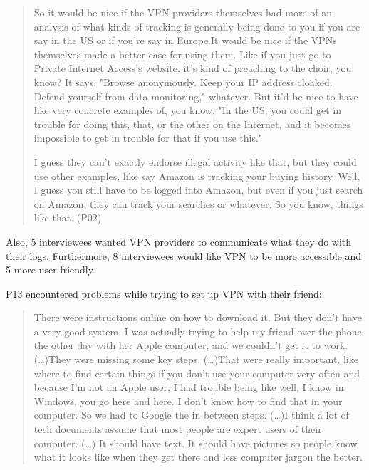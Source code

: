 \begin{quote}So it would be nice if the VPN providers themselves had more of
    an analysis of what kinds of tracking is generally being done to you if
    you are say in the US or if you're say in Europe.It would be nice if the
    VPNs themselves made a better case for using them. Like if you just go to
    Private Internet Access's website, it's kind of preaching to the choir,
    you know? It says, "Browse anonymously. Keep your IP address cloaked.
    Defend yourself from data monitoring," whatever. But it'd be nice to have
    like very concrete examples of, you know, "In the US, you could get in
    trouble for doing this, that, or the other on the Internet, and it becomes
    impossible to get in trouble for that if you use this."

I guess they can't exactly endorse illegal activity like that, but they could
use other examples, like say Amazon is tracking your buying history. Well, I
guess you still have to be logged into Amazon, but even if you just search on
Amazon, they can track your searches or whatever. So you know, things like
that. (P02)\end{quote}


Also, 5 interviewees wanted VPN providers to communicate what they do with
their logs. Furthermore, 8 interviewees would like VPN to be more accessible
and 5 more user-friendly. 

P13 encountered problems while trying to set up VPN with their friend:
\begin{quote}There were instructions online on how to download it. But they
don't have a very good system. I was actually trying to help my friend over
the phone the other day with her Apple computer, and we couldn't get it to
work. (\dots)They were missing some key steps. (\dots)That were really
important, like where to find certain things if you don't use your computer
very often and because I'm not an Apple user, I had trouble being like well, I
know in Windows, you go here and here. I don't know how to find that in your
computer. So we had to Google the in between steps. (\dots)I think a lot of
tech documents assume that most people are expert users of their computer.
(\dots) It should have text. It should have pictures so people know what it
looks like when they get there and less computer jargon the better.\end{quote}

